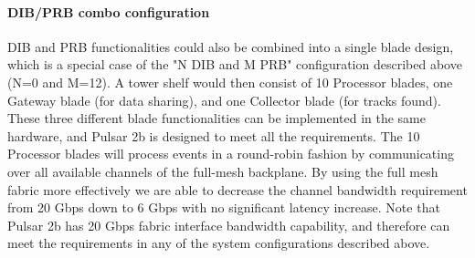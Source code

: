 

\paragraph{DIB/PRB combo configuration}




\noindent DIB and PRB functionalities could also be combined into a single blade design, which is a special case of the "N DIB and M PRB" configuration described above (N=0 and M=12). A tower shelf would then consist of 10 Processor blades, one Gateway blade (for data sharing), and one Collector blade (for tracks found). These three different blade functionalities can be implemented in the same hardware, and Pulsar 2b is designed to meet all the requirements. The 10 Processor blades will process events in a round-robin fashion by  communicating over all available channels of the full-mesh backplane.
By using the full mesh fabric more effectively we are able to decrease the channel bandwidth requirement from 20 Gbps down to 6 Gbps with no significant latency increase. Note that Pulsar 2b has 20 Gbps fabric interface bandwidth capability, and therefore can meet the requirements in any of the system configurations described above.  


